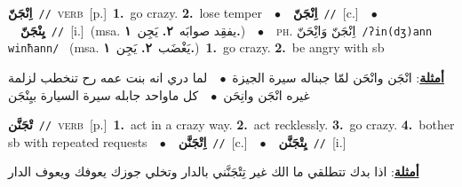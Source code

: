 \documentclass[10pt,a4paper,twoside]{article} %
\begin{document}
\begin{multicols}{2}
{\setlength\topsep{0pt}\textbf{\foreignlanguage{arabic}{اِنْجَنّ}}\ {\color{gray}\texttt{//}\color{black}}\ \textsc{verb}\ [p.]\ \textbf{1.}~go crazy.  \textbf{2.}~lose temper\ \ $\bullet$\ \ \setlength\topsep{0pt}\textbf{\foreignlanguage{arabic}{اِنْجَنّ}}\ {\color{gray}\texttt{//}\color{black}}\ [c.]\ \ $\bullet$\ \ \setlength\topsep{0pt}\textbf{\foreignlanguage{arabic}{يِنْجَنّ}}\ {\color{gray}\texttt{//}\color{black}}\ [i.]\ \color{gray}(msa. \foreignlanguage{arabic}{يفقِد صوابَه}~\foreignlanguage{arabic}{\textbf{٢.}}  \foreignlanguage{arabic}{يَجِن}~\foreignlanguage{arabic}{\textbf{١.}})\color{black}\ \ $\bullet$\ \ \textsc{ph.} \color{gray} \foreignlanguage{arabic}{اِنْجَنّ وَانِْحَنّ}\color{black}\ {\color{gray}\texttt{/{\sffamily ʔin(dʒ)ann winħann}/}\color{black}}\ \color{gray} (msa. \foreignlanguage{arabic}{يَغْضَب}~\foreignlanguage{arabic}{\textbf{٢.}}  \foreignlanguage{arabic}{يَجِن}~\foreignlanguage{arabic}{\textbf{١.}})\color{black}\ \textbf{1.}~go crazy.  \textbf{2.}~be angry with sb\  \begin{flushright}\color{gray}\foreignlanguage{arabic}{\textbf{\underline{\foreignlanguage{arabic}{أمثلة}}}: انْجَن وانْحَن لمّا جبناله سيرة الجيزة\ $\bullet$\ \  لما دري انه بنت عمه رح تنخطب لزلمة غيره انْجَن وانِحَن\ $\bullet$\ \  كل ماواحد جابله سيرة السيارة بيِنْجَن}\end{flushright}\color{black}} \vspace{2mm}

{\setlength\topsep{0pt}\textbf{\foreignlanguage{arabic}{تْجَنَّن}}\ {\color{gray}\texttt{//}\color{black}}\ \textsc{verb}\ [p.]\ \textbf{1.}~act in a crazy way.  \textbf{2.}~act recklessly.  \textbf{3.}~go crazy.  \textbf{4.}~bother sb with repeated requests\ \ $\bullet$\ \ \setlength\topsep{0pt}\textbf{\foreignlanguage{arabic}{اِتْجَنَّن}}\ {\color{gray}\texttt{//}\color{black}}\ [c.]\ \ $\bullet$\ \ \setlength\topsep{0pt}\textbf{\foreignlanguage{arabic}{يِتْجَنَّن}}\ {\color{gray}\texttt{//}\color{black}}\ [i.]\  \begin{flushright}\color{gray}\foreignlanguage{arabic}{\textbf{\underline{\foreignlanguage{arabic}{أمثلة}}}: اذا بدك تتطلقي ما الك غير تِتْجَنَّني بالدار وتخلي جوزك يعوفك ويعوف الدار}\end{flushright}\color{black}} \vspace{2mm}


\end{multicols}
\end{document}
